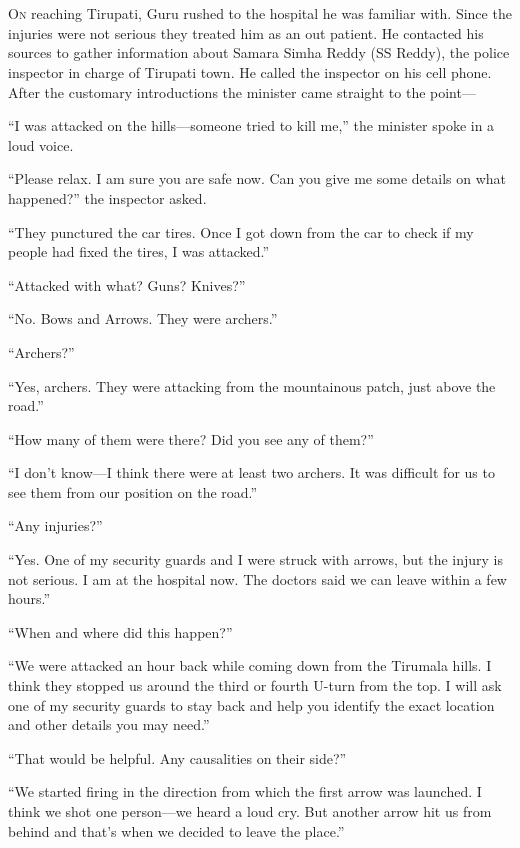 \chapter{}

\lettrine{O}{n} reaching Tirupati, Guru rushed to the hospital he was familiar with. Since
the injuries were not serious they treated him as an out patient. He contacted
his sources to gather information about Samara Simha Reddy (SS Reddy), the
police inspector in charge of Tirupati town. He called the inspector on his cell
phone. After the customary introductions the minister came straight to the point—

“I was attacked on the hills—someone tried to kill me,” the minister spoke in
a loud voice.

“Please relax. I am sure you are safe now. Can you give me some details on what
happened?” the inspector asked.

“They punctured the car tires. Once I got down from the car to check if my
people had fixed the tires, I was attacked.”

“Attacked with what? Guns? Knives?”

“No. Bows and Arrows. They were archers.”

“Archers?”

“Yes, archers. They were attacking from the mountainous patch, just above the
road.”

“How many of them were there? Did you see any of them?”

“I don't know—I think there were at least two archers. It was difficult for us
to see them from our position on the road.”

“Any injuries?”

“Yes. One of my security guards and I were struck with arrows, but the injury is
not serious. I am at the hospital now. The doctors said we can leave within a
few hours.”

“When and where did this happen?”

“We were attacked an hour back while coming down from the Tirumala hills. I
think they stopped us around the third or fourth U-turn from the top. I will ask
one of my security guards to stay back and help you identify the exact location
and other details you may need.”

“That would be helpful. Any causalities on their side?”

“We started firing in the direction from which the first arrow was launched. I
think we shot one person—we heard a loud cry. But another arrow hit us from
behind and that's when we decided to leave the place.”

